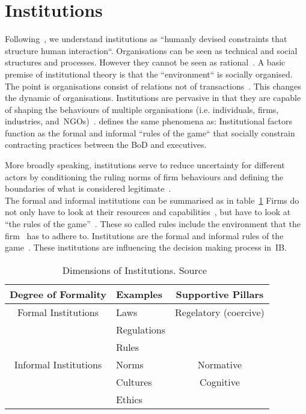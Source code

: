 \section{Institutions}\label{sec:InTh}

Following~\cite{North:1990}, we understand institutions as ``humanly devised constraints that structure human interaction``. 
Organisations can be seen as technical and social structures and processes. 
However they cannot be seen as rational~\cite{Westney:2005}. 
A basic premise of institutional theory is that the ``environment`` is socially organised. 
The point is organisations consist of relations not of transactions~\cite{Westney:2005}. This changes the dynamic of organisations.
Institutions are pervasive in that they are capable of shaping the behaviours of multiple organisations (i.e. individuals, firms, industries, and~\glspl{NGO})~\cite{Peng:2008}.  
\cite{North:1990} defines the same phenomena as:
Institutional factors function as the formal and informal ``rules of the game`` that socially constrain contracting practices between the \gls{BoD} and executives.

More broadly speaking, institutions serve to reduce uncertainty for different actors by conditioning the ruling norms of firm behaviours and defining the boundaries of what is considered legitimate~\cite{Peng:2008}.\\
The formal and informal institutions can be summarised as in table~\ref{tab:peng2008}
Firms do not only have to look at their resources and capabilities~\cite{Barney:1991}, but have to look at ``the rules of the game''~\cite{Scott:1995}. 
These so called rules include the environment that the firm \mne~has to adhere to.
Institutions are the formal and informal rules of the game~\cite{North:1990}. These institutions are influencing the decision making process in~\gls{IB}.

\begin{table}[htb]
  \centering
  \caption[Dimensions of Institutions]{Dimensions of Institutions. Source~\cite{Peng:2008b}} 
  \label{tab:peng2008}
\begin{tabular}{c|l|c} 
  Degree of Formality & Examples & Supportive Pillars\\ 
  \midrule 
  \midrule
  Formal Institutions& Laws&  Regelatory (coercive)\\
  &Regulations&\\
  &Rules&\\
  Informal Institutions&Norms &Normative \\
  & Cultures&Cognitive\\
  &Ethics&\\ 
  \bottomrule
\end{tabular}
\end{table}

